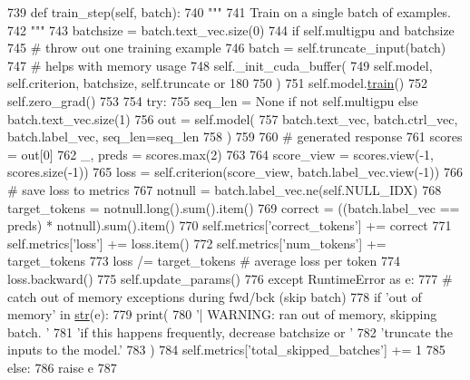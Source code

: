 \begin{DoxyCode}
739     \textcolor{keyword}{def }train\_step(self, batch):
740         \textcolor{stringliteral}{"""}
741 \textcolor{stringliteral}{        Train on a single batch of examples.}
742 \textcolor{stringliteral}{        """}
743         batchsize = batch.text\_vec.size(0)
744         \textcolor{keywordflow}{if} self.multigpu \textcolor{keywordflow}{and} batchsize %
745             \textcolor{comment}{# throw out one training example}
746             batch = self.truncate\_input(batch)
747         \textcolor{comment}{# helps with memory usage}
748         self.\_init\_cuda\_buffer(
749             self.model, self.criterion, batchsize, self.truncate \textcolor{keywordflow}{or} 180
750         )
751         self.model.\hyperlink{namespaceprojects_1_1mastering__the__dungeon_1_1mturk_1_1tasks_1_1MTD_1_1run_a36a5f4f6f9df0611a6818610518d2cf0}{train}()
752         self.zero\_grad()
753 
754         \textcolor{keywordflow}{try}:
755             seq\_len = \textcolor{keywordtype}{None} \textcolor{keywordflow}{if} \textcolor{keywordflow}{not} self.multigpu \textcolor{keywordflow}{else} batch.text\_vec.size(1)
756             out = self.model(
757                 batch.text\_vec, batch.ctrl\_vec, batch.label\_vec, seq\_len=seq\_len
758             )
759 
760             \textcolor{comment}{# generated response}
761             scores = out[0]
762             \_, preds = scores.max(2)
763 
764             score\_view = scores.view(-1, scores.size(-1))
765             loss = self.criterion(score\_view, batch.label\_vec.view(-1))
766             \textcolor{comment}{# save loss to metrics}
767             notnull = batch.label\_vec.ne(self.NULL\_IDX)
768             target\_tokens = notnull.long().sum().item()
769             correct = ((batch.label\_vec == preds) * notnull).sum().item()
770             self.metrics[\textcolor{stringliteral}{'correct\_tokens'}] += correct
771             self.metrics[\textcolor{stringliteral}{'loss'}] += loss.item()
772             self.metrics[\textcolor{stringliteral}{'num\_tokens'}] += target\_tokens
773             loss /= target\_tokens  \textcolor{comment}{# average loss per token}
774             loss.backward()
775             self.update\_params()
776         \textcolor{keywordflow}{except} RuntimeError \textcolor{keyword}{as} e:
777             \textcolor{comment}{# catch out of memory exceptions during fwd/bck (skip batch)}
778             \textcolor{keywordflow}{if} \textcolor{stringliteral}{'out of memory'} \textcolor{keywordflow}{in} \hyperlink{namespacegenerate__task__READMEs_a5b88452ffb87b78c8c85ececebafc09f}{str}(e):
779                 print(
780                     \textcolor{stringliteral}{'| WARNING: ran out of memory, skipping batch. '}
781                     \textcolor{stringliteral}{'if this happens frequently, decrease batchsize or '}
782                     \textcolor{stringliteral}{'truncate the inputs to the model.'}
783                 )
784                 self.metrics[\textcolor{stringliteral}{'total\_skipped\_batches'}] += 1
785             \textcolor{keywordflow}{else}:
786                 \textcolor{keywordflow}{raise} e
787 
\end{DoxyCode}
